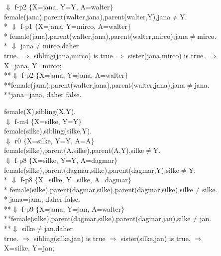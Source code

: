 \documentclass[11pt]{article}
\begin{document}
{\begin{flushleft}
 $\Downarrow$ f-p2 $\lbrace$X=jana, Y=Y, A=walter$\rbrace$\\
 female(jana),parent(walter,jana),parent(walter,Y),jana$\neq$Y. \\
* $\Downarrow$ f-p1 $\lbrace$X=jana, Y=mirco, A=walter$\rbrace$\\
* female(jana),parent(walter,jana),parent(walter,mirco),jana$\neq$mirco. \\
* $\Downarrow$ jana$\neq$mirco,daher \\
true. $\Rightarrow$ sibling(jana,mirco)  is true $\Rightarrow$ sister(jana,mirco) is true. $\Rightarrow$\\
X=jana, Y=mirco;\\
**$\Downarrow$ f-p2 $\lbrace$X=jana, Y=jana, A=walter$\rbrace$\\
**female(jana),parent(walter,jana),parent(walter,jana),jana$\neq$jana. \\
**jana=jana, daher false.
 \end{flushleft} 
  \begin{flushleft}
 female(X),sibling(X,Y).\\
 $\Downarrow$ f-m4 $\lbrace$X=silke, Y=Y$\rbrace$\\
 female(silke),sibling(silke,Y).\\
 $\Downarrow$ r0 $\lbrace$X=silke, Y=Y, A=A$\rbrace$\\
 female(silke),parent(A,silke),parent(A,Y),silke$\neq$Y. \\
 $\Downarrow$ f-p8 $\lbrace$X=silke, Y=Y, A=dagmar$\rbrace$\\
 female(silke),parent(dagmar,silke),parent(dagmar,Y),silke$\neq$Y. \\
* $\Downarrow$ f-p8 $\lbrace$X=silke, Y=silke, A=dagmar$\rbrace$\\
* female(silke),parent(dagmar,silke),parent(dagmar,silke),silke$\neq$silke. \\
* jana=jana, daher false.\\
**$\Downarrow$ f-p9 $\lbrace$X=jana, Y=jan, A=walter$\rbrace$\\
**female(silke),parent(dagmar,silke),parent(dagmar,jan),silke$\neq$jan. \\
**$\Downarrow$ silke$\neq$jan,daher \\
true. $\Rightarrow$ sibling(silke,jan)  is true $\Rightarrow$ sister(silke,jan) is true. $\Rightarrow$\\
X=silke, Y=jan;
 \end{flushleft} 
 \newpage
 \begin{flushleft}

\end{flushleft}}
\end{document}
